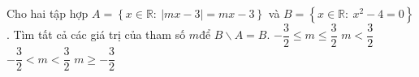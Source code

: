 \begin{ex} %
Cho hai tập hợp $A=\left\{ x\in \mathbb{R}: \ | mx-3 |=mx-3 \right\}$ và $B=\left\{  x\in \mathbb{R}:\ x^2-4=0 \right\}$. Tìm tất cả các giá trị của tham số $m$để $B\backslash A=B$.
\choice
{ $-\dfrac{3}{2}\le m\le \dfrac{3}{2}$}
{ $m<\dfrac{3}{2}$}
{ \True $-\dfrac{3}{2}<m<\dfrac{3}{2}$}
{ $m\ge -\dfrac{3}{2}$}
\end{ex}


